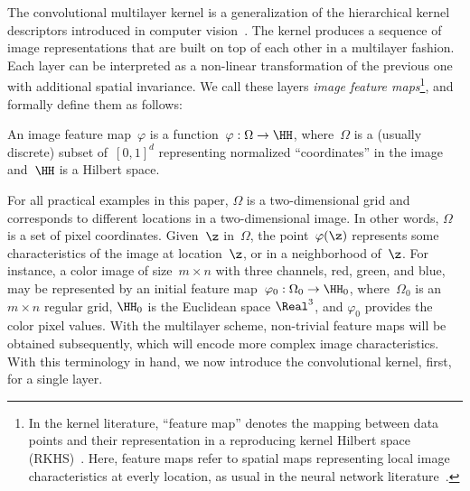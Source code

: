 The convolutional multilayer kernel is a generalization of the hierarchical kernel
descriptors introduced in computer vision~\cite{bo2011,bo2010}. The kernel produces a
sequence of image representations that are built on top of each other in a
multilayer fashion. Each layer can be interpreted as a non-linear
transformation of the previous one with additional spatial invariance. We call these
layers \emph{image feature maps}\footnote{In the kernel literature, ``feature map'' denotes the mapping between data points and their representation in a reproducing kernel Hilbert space (RKHS)~\cite{shawe2004}. Here, feature maps refer to spatial maps representing local image characteristics at everly location, as usual in the neural network literature~\cite{lecun1998}.}, and formally define them as follows:
\begin{definition}
   An image feature map~$\varphi$ is a function~$\varphi : \Omega
   \to \HH$, where~$\Omega$ is a (usually discrete) subset of~$[0,1]^d$
   representing normalized ``coordinates'' in the image and~$\HH$ is a Hilbert space.
\end{definition}
For all practical examples in this paper, $\Omega$ is a two-dimensional grid
and corresponds to different locations in a two-dimensional image. In other
words, $\Omega$ is a set of pixel coordinates. Given~$\z$ in~$\Omega$, the
point~$\varphi(\z)$ represents some characteristics of the image at
location~$\z$, or in a neighborhood of~$\z$.
For instance, a color image of size~$m \times n$ with three
channels, red, green, and blue, may be represented by an initial feature
map~$\varphi_0: \Omega_0 \to \HH_0$, where~$\Omega_0$ is an~$m \times n$ regular grid, $\HH_0$ is the Euclidean space $\Real^3$, and $\varphi_0$
provides the color pixel values. With the multilayer scheme, non-trivial feature maps will be
obtained subsequently, which will encode more complex image characteristics.
With this terminology in hand, we now introduce the convolutional kernel, first, for a single layer.

